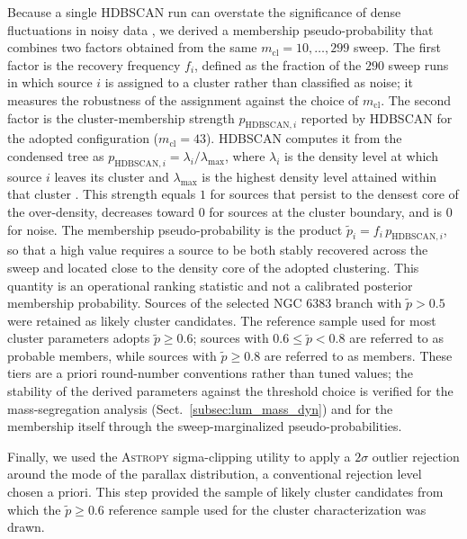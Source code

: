 \documentclass{aa}
\begin{document}
Because a single \textsc{HDBSCAN} run can overstate the significance of dense fluctuations in noisy data \citep{2021A&A...646A.104H}, we derived a membership pseudo-probability that combines two factors obtained from the same $m_{\mathrm{cl}}=10,\ldots,299$ sweep. The first factor is the recovery frequency $f_i$, defined as the fraction of the $290$ sweep runs in which source $i$ is assigned to a cluster rather than classified as noise; it measures the robustness of the assignment against the choice of $m_{\mathrm{cl}}$. The second factor is the cluster-membership strength $p_{\mathrm{HDBSCAN},i}$ reported by \textsc{HDBSCAN} for the adopted configuration ($m_{\mathrm{cl}}=43$). \textsc{HDBSCAN} computes it from the condensed tree as $p_{\mathrm{HDBSCAN},i}=\lambda_i/\lambda_{\mathrm{max}}$, where $\lambda_i$ is the density level at which source $i$ leaves its cluster and $\lambda_{\mathrm{max}}$ is the highest density level attained within that cluster \citep{McInnes2017}. This strength equals $1$ for sources that persist to the densest core of the over-density, decreases toward $0$ for sources at the cluster boundary, and is $0$ for noise. The membership pseudo-probability is the product $\tilde{p}_i=f_i\,p_{\mathrm{HDBSCAN},i}$, so that a high value requires a source to be both stably recovered across the sweep and located close to the density core of the adopted clustering. This quantity is an operational ranking statistic and not a calibrated posterior membership probability. Sources of the selected NGC 6383 branch with $\tilde{p}>0.5$ were retained as likely cluster candidates. The reference sample used for most cluster parameters adopts $\tilde{p}\geq0.6$; sources with $0.6\leq\tilde{p}<0.8$ are referred to as probable members, while sources with $\tilde{p}\geq0.8$ are referred to as members. These tiers are a priori round-number conventions rather than tuned values; the stability of the derived parameters against the threshold choice is verified for the mass-segregation analysis (Sect.~\ref{subsec:lum_mass_dyn}) and for the membership itself through the sweep-marginalized pseudo-probabilities.

Finally, we used the \textsc{Astropy} sigma-clipping \citep{astropy:2013,astropy:2018,astropy:2022} utility to apply a $2\sigma$ outlier rejection around the mode of the parallax distribution, a conventional rejection level chosen a priori. This step provided the sample of likely cluster candidates from which the $\tilde{p}\geq0.6$ reference sample used for the cluster characterization was drawn.
\end{document}
